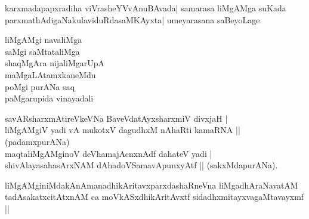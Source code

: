 \begin{entry}
\gl{}
\begin{shl}
karxmadapapxradiha viVrasheYVvAnuBAvada| samarasa liMgAMga suKada\\
parxmathAdigaNakulaviduRdasaMKAyxta| umeyarasana saBeyoLage
\end{shl}
\end{entry}

\begin{entry}

\begin{shl}
liMgAMgi navaliMga\\
saMgi saMtataliMga\\
shaqMgAra nijaliMgarUpA\\
maMgaLAtamxkaneMdu\\
poMgi purANa saq\\
paMgarupida vinayadali
\end{shl}
\end{entry}

\begin{entry}
\begin{shl}
savARsharxmAtireVkeVNa BaveVdatAyxsharxmiV divxjaH |\\
liMgAMgiV yadi vA mukotxV dagudhxM nAhaRti kamaRNA || (padamxpurANa)\\
maqtaliMgAMginoV deVhamajAcnxnAdf dahateV yadi |\\
shivAlayasahasArxNAM dAhadoVSamavApunxyAtf || (sakxMdapurANa).
\end{shl}
\begin{shl}
liMgAMginiMdakAnAmanadhikAritavxparxdashaRneVna liMgadhAraNavatAM\\
tadAsakatxcitAtxnAM ca moVkASxdhikAritAvxtf sidadhxmitayxvagaMtavayxmf ||
\end{shl}
\end{entry}

